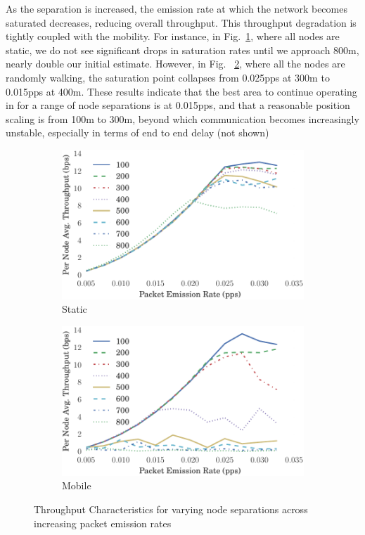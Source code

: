 \documentclass[conference]{IEEEtran}
\begin{document}
As the separation is increased, the emission rate at which the network becomes saturated decreases, reducing overall throughput. 
This throughput degradation is tightly coupled with the mobility.
For instance, in Fig.~\ref{fig:throughput_static}, where all nodes are static, we do not see significant drops in saturation rates until we approach 800m, nearly double our initial estimate. 
However, in Fig. ~\ref{fig:throughput_all_mobile}, where all the nodes are randomly walking, the saturation point collapses from 0.025pps at 300m to 0.015pps at 400m.
These results indicate that the best area to continue operating in for a range of node separations is at 0.015pps, and that a reasonable position scaling is from 100m to 300m, beyond which communication becomes increasingly unstable, especially in terms of end to end delay (not shown) 
%
\begin{figure}[h]
\begin{subfigure}{.5\textwidth}
  \centering
  \includegraphics[width=.9\linewidth]{img/throughput_sep_lines_static.pdf}
  \caption{Static}
  \label{fig:throughput_static}
\end{subfigure}%
\begin{subfigure}{.5\textwidth}
\centering
  \includegraphics[width=.9\linewidth]{img/throughput_sep_lines_all_mobile.pdf}
  \caption{Mobile}
  \label{fig:throughput_all_mobile}
\end{subfigure}
\caption{Throughput Characteristics for varying node separations across increasing packet emission rates}
\label{fig:scenario_throughputs_plain}
\end{figure}
%
\end{document}
